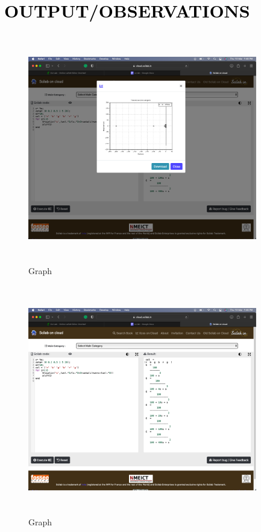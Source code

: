 \documentclass[12pt]{article}
\begin{document}
   \par 

\section*{\textcolor{black}{OUTPUT/OBSERVATIONS}}

\begin{figure}[!hth]
        \centering
        \includegraphics[width =10cm, height = 10cm]{images/exp131.png}
        \caption{Graph}
        \label{Graph}
\end{figure}

\begin{figure}[!hth]
        \centering
        \includegraphics[width =10cm, height = 10cm]{images/exp132.png}
        \caption{Graph}
        \label{Result}
\end{figure}
\end{document}
